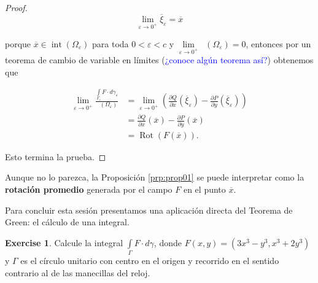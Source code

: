 \documentclass[
]{krantz}
\theoremstyle{definition}
\renewcommand{\epsilon}{\varepsilon}  %
\theoremstyle{definition}
\theoremstyle{definition}
\theoremstyle{definition}
\newtheorem{exercise}{Exercise}[chapter]
\theoremstyle{remark}
\begin{document}
\begin{proof}
\begin{equation*}
        \lim\limits_{\epsilon\to 0^{+}} \overline{\xi}_{\epsilon} = \overline{x}
\end{equation*}

porque \(\overline{x}\in\mathop{\mathrm{int}}\left(\Omega_{\epsilon}\right)\) para toda \(0<\epsilon < c\) y \(\lim\limits_{\epsilon\to 0^{+}} \mathop{\mathrm{di\acute{a}m}}\left(\Omega_{\epsilon}\right)=0\), entonces por un teorema de cambio de variable en límites (\textcolor{blue}{¿conoce algún teorema así?}) obtenemos que

\begin{align*}
        \displaystyle\lim\limits_{\epsilon\to 0^{+}} \frac{\displaystyle\int\limits_{\Gamma_{\epsilon}} F\cdot d\gamma_{\epsilon}}{\mathop{\mathrm{\acute{a}rea}}\left(\Omega_{\epsilon}\right)}  & = \lim\limits_{\epsilon\to 0^{+}}\left(\frac{\partial Q}{\partial x}\left(\overline{\xi}_{\epsilon}\right) - \frac{\partial P}{\partial y}\left( \overline{\xi}_{\epsilon}\right)\right) \\
        & = \frac{\partial Q}{\partial x}\left(\overline{x}\right) - \frac{\partial P}{\partial y}\left(\overline{x}\right) \\
        & = \mathop{\mathrm{Rot}}\left( F(\overline{x})\right).
\end{align*}

Esto termina la prueba.
\end{proof}

Aunque no lo parezca, la Proposición \ref{prp:prop01} se puede interpretar como la \textbf{rotación promedio} generada por el campo \(F\) en el punto \(\overline{x}\).

Para concluir esta sesión presentamos una aplicación directa del Teorema de Green: el cálculo de una integral.

\begin{exercise}
\protect\hypertarget{exr:ej01}{}{\label{exr:ej01} } Calcule la integral \(\displaystyle\int\limits_{\Gamma} F\cdot d\gamma\), donde \(F(x,y) = \left(3x^3-y^3, x^3 +2y^3\right)\) y \(\Gamma\) es el círculo unitario con centro en el origen y recorrido en el sentido contrario al de las manecillas del reloj.
\end{exercise}
\end{document}
